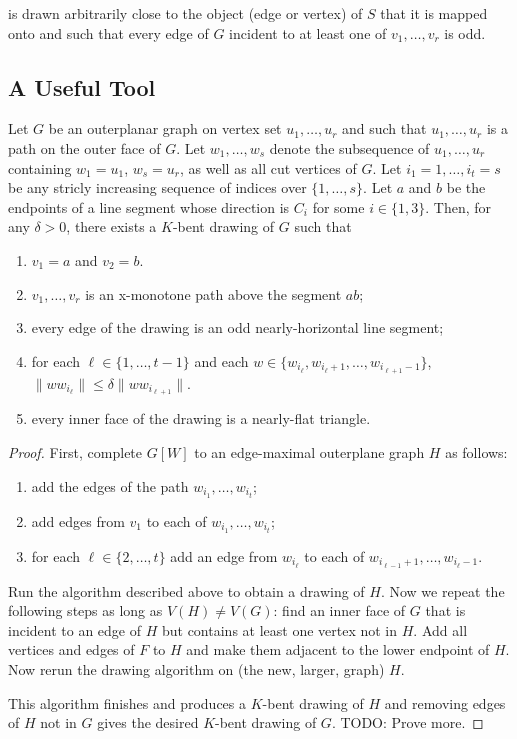 \documentclass{patmorin}
\begin{document}
 is drawn arbitrarily close to the object (edge or
vertex) of $S$ that it is mapped onto and such that every edge of $G$
incident to at least one of $v_1,\ldots,v_r$ is odd.


\subsection{A Useful Tool}

\begin{lem}
   Let $G$ be an outerplanar graph on vertex set $u_1,\ldots,u_r$ and such that $u_1,\ldots,u_r$ is a path on the outer face of $G$.  Let $w_1,\ldots,w_s$ denote the subsequence of $u_1,\ldots,u_r$ containing $w_1=u_1$, $w_s=u_r$, as well as all cut vertices of $G$.  Let $i_1=1,\dots,i_t=s$ be any stricly increasing sequence of indices over $\{1,\ldots,s\}$. Let $a$ and $b$ be the endpoints of a line segment whose direction is $C_i$ for some $i\in\{1,3\}$.  
   Then, for any $\delta>0$,
   there exists a $K$-bent drawing of $G$ such that 
\begin{enumerate}
   \item $v_1=a$ and $v_2=b$.
   \item $v_1,\ldots,v_r$ is an x-monotone path above the segment $ab$; 
   \item every edge of the drawing is an odd nearly-horizontal line segment;
   \item for each $\ell\in\{1,\ldots,t-1\}$ and each $w\in\{w_{i_\ell},w_{i_\ell+1},\ldots,w_{i_{\ell+1}-1}\}$, $\|ww_{i_\ell}\| \le \delta\|ww_{i_{\ell+1}}\|$.
   \item every inner face of the drawing is a nearly-flat triangle.
\end{enumerate}
\end{lem}


\begin{proof}
  First, complete $G[W]$ to an edge-maximal outerplane graph $H$ as follows:
\begin{enumerate}
  \item add the edges of the path $w_{i_1},\ldots,w_{i_t}$;
  \item add edges from $v_1$ to each of $w_{i_1},\ldots,w_{i_t}$;
  \item for each $\ell\in\{2,\ldots,t\}$ add an edge from $w_{i_\ell}$ to each of $w_{i_{\ell-1}+1},\ldots,w_{i_\ell-1}$. 
\end{enumerate}
  Run the algorithm described above to obtain a drawing of $H$.  Now we
  repeat the following steps as long as $V(H)\neq V(G)$: find an inner
  face of $G$ that is incident to an edge of $H$ but contains at least
  one vertex not in $H$. Add all vertices and edges of $F$ to $H$ and
  make them adjacent to the lower endpoint of $H$. Now rerun the drawing
  algorithm on (the new, larger, graph) $H$.

  This algorithm finishes and produces a $K$-bent drawing of $H$ and
  removing edges of $H$ not in $G$ gives the desired $K$-bent drawing
  of $G$.  TODO: Prove more.
\end{proof}
\end{document}
